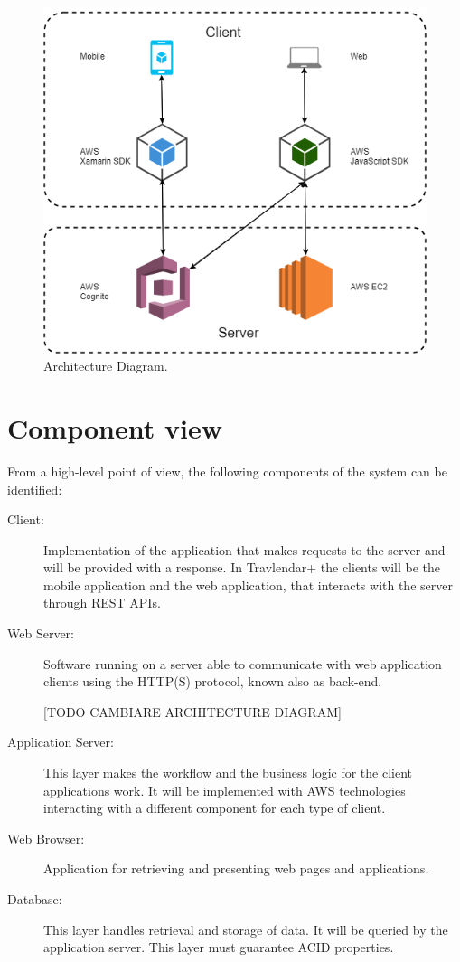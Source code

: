 \begin{figure}
	\centering
	\includegraphics[width=4.5in]{diagrams/ArchitectureDiagram.png} 
	\caption{Architecture Diagram.}   
\end{figure}

\section{Component view}
\label{sec:comp_view}

From a high-level point of view, the following components of the system can be identified:
\begin{description}
	\item[Client:] Implementation of the application that makes requests to the server and will be provided with a response. In Travlendar+ the clients will be the mobile application and the web application, that interacts with the server through REST APIs.
	\item[Web Server:] Software running on a server able to communicate with web application clients using the HTTP(S) protocol, known also as back-end.
	
	[TODO CAMBIARE ARCHITECTURE DIAGRAM]
	
	\item[Application Server:] This layer makes the workflow and the business logic for the client applications work. It will be implemented with AWS technologies interacting with a different component for each type of client.
	\item[Web Browser:] Application for retrieving and presenting web pages and applications.
	\item[Database:] This layer handles retrieval and storage of data. It will be queried by the application server. This layer must guarantee ACID properties.
\end{description}

